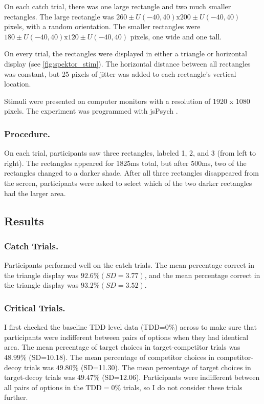 On each catch trial, there was one large rectangle and two much smaller rectangles. The large rectangle was $260 \pm U(-40, 40) \text{x} 200 \pm U(-40, 40)$ pixels, with a random orientation. The smaller rectangles were $180 \pm U(-40, 40) \text{x} 120 \pm U(-40, 40)$ pixels, one wide and one tall.

On every trial, the rectangles were displayed in either a triangle or horizontal display (see \ref{fig:spektor_stim}). The horizontal distance between all rectangles was constant, but 25 pixels of jitter was added to each rectangle's vertical location.

Stimuli were presented on computer monitors with a resolution of 1920 x 1080 pixels. The experiment was programmed with jsPsych \parencite{deleeuwJsPsychJavaScriptLibrary2015}. 

\subsubsection{Procedure.}
On each trial, participants saw three rectangles, labeled 1, 2, and 3 (from left to right). The rectangles appeared for 1825ms total, but after 500ms, two of the rectangles changed to a darker shade. After all three rectangles disappeared from the screen, participants were asked to select which of the two darker rectangles had the larger area.

\subsection{Results}

\subsubsection{Catch Trials.}
Participants performed well on the catch trials. The mean percentage correct in the triangle display was $92.6\% (SD=3.77)$, and the mean percentage correct in the triangle display was $93.2\% (SD=3.52)$. 

\subsubsection{Critical Trials.}
I first checked the baseline TDD level data (TDD=$0\%$) across to make sure that participants were indifferent between pairs of options when they had identical area. The mean percentage of target choices in target-competitor trials was $48.99\%$ (SD=10.18). The mean percentage of competitor choices in competitor-decoy trials was $49.80\%$ (SD=11.30). The mean percentage of target choices in target-decoy trials was $49.47\%$ (SD=12.06). Participants were indifferent between all pairs of options in the $\text{TDD}=0\%$ trials, so I do not consider these trials further.

